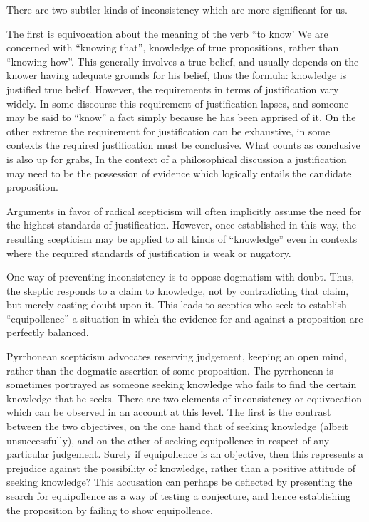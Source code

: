 There are two subtler kinds of inconsistency which are more significant for us.

The first is equivocation about the meaning of the verb ``to know'
We are concerned with ``knowing that'', knowledge of true propositions, rather than ``knowing how''.
This generally involves a true belief, and usually depends on the knower having adequate grounds for his belief, thus the formula: knowledge is justified true belief.
However, the requirements in terms of justification vary widely.
In some discourse this requirement of justification lapses, and someone may be said to ``know'' a fact simply because he has been apprised of it.
On the other extreme the requirement for justification can be exhaustive, in some contexts the required justification must be conclusive.
What counts as conclusive is also up for grabs,
In the context of a philosophical discussion a justification may need to be the possession of evidence which logically entails the candidate proposition.

Arguments in favor of radical scepticism will often implicitly assume the need for the highest standards of justification.
However, once established in this way, the resulting scepticism may be applied to all kinds of ``knowledge'' even in contexts where the required standards of justification is weak or nugatory.

One way of preventing inconsistency is to oppose dogmatism with doubt.
Thus, the skeptic responds to a claim to knowledge, not by contradicting that claim, but merely casting doubt upon it.
This leads to sceptics who seek to establish ``equipollence'' a situation in which the evidence for and against a proposition are perfectly balanced.

Pyrrhonean scepticism advocates reserving judgement, keeping an open mind, rather than the dogmatic assertion of some proposition.
The pyrrhonean is sometimes portrayed as someone seeking knowledge who fails to find the certain knowledge that he seeks.
There are two elements of inconsistency or equivocation which can be observed in an account at this level.
The first is the contrast between the two objectives, on the one hand that of seeking knowledge (albeit unsuccessfully), and on the other of seeking equipollence in respect of any particular judgement.
Surely if equipollence is an objective, then this represents a prejudice against the possibility of knowledge, rather than a positive attitude of seeking knowledge?
This accusation can perhaps be deflected by presenting the search for equipollence as a way of testing a conjecture, and hence establishing the proposition by failing to show equipollence.

